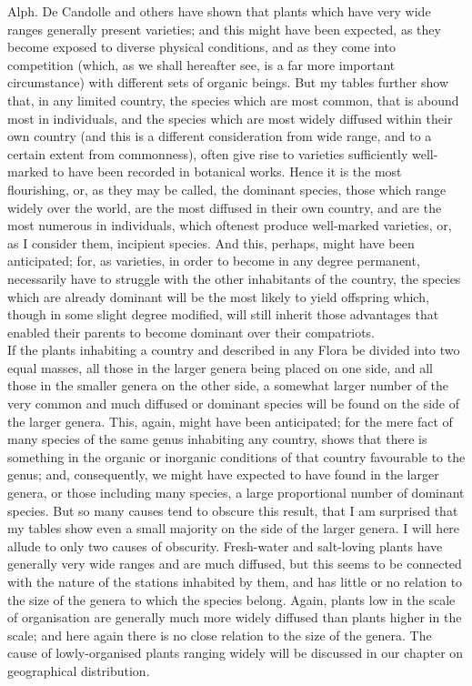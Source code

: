 \indent Alph. De Candolle and others have shown that plants which have very wide ranges generally present varieties; and this might have been expected, as they become exposed to diverse physical conditions, and as they come into competition (which, as we shall hereafter see, is a far more important circumstance) with different sets of organic beings. But my tables further show that, in any limited country, the species which are most common, that is abound most in individuals, and the species which are most widely diffused within their own country (and this is a different consideration from wide range, and to a certain extent from commonness), often give rise to varieties sufficiently well-marked to have been recorded in botanical works. Hence it is the most flourishing, or, as they may be called, the dominant species, those which range widely over the world, are the most diffused in their own country, and are the most numerous in individuals, which oftenest produce well-marked varieties, or, as I consider them, incipient species. And this, perhaps, might have been anticipated; for, as varieties, in order to become in any degree permanent, necessarily have to struggle with the other inhabitants of the country, the species which are already dominant will be the most likely to yield offspring which, though in some slight degree modified, will still inherit those advantages that enabled their parents to become dominant over their compatriots. \\
\indent If the plants inhabiting a country and described in any Flora be divided into two equal masses, all those in the larger genera being placed on one side, and all those in the smaller genera on the other side, a somewhat larger number of the very common and much diffused or dominant species will be found on the side of the larger genera. This, again, might have been anticipated; for the mere fact of many species of the same genus inhabiting any country, shows that there is something in the organic or inorganic conditions of that country favourable to the genus; and, consequently, we might have expected to have found in the larger genera, or those including many species, a large proportional number of dominant species.  But so many causes tend to obscure this result, that I am surprised that my tables show even a small majority on the side of the larger genera. I will here allude to only two causes of obscurity. Fresh-water and salt-loving plants have generally very wide ranges and are much diffused, but this seems to be connected with the nature of the stations inhabited by them, and has little or no relation to the size of the genera to which the species belong. Again, plants low in the scale of organisation are generally much more widely diffused than plants higher in the scale; and here again there is no close relation to the size of the genera. The cause of lowly-organised plants ranging widely will be discussed in our chapter on geographical distribution. \\
